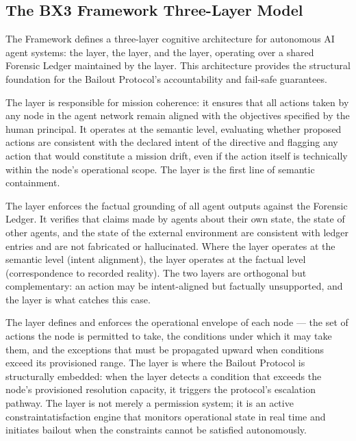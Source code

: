 \subsection{The BX3 Framework Three-Layer Model}
\label{sec:bx3-model}

The \bxthree{} Framework defines a three-layer cognitive architecture for autonomous AI agent systems: the \purpose{} layer, the \truth{} layer, and the \bounds{} layer, operating over a shared Forensic Ledger maintained by the \fact{} layer. This architecture provides the structural foundation for the Bailout Protocol's accountability and fail-safe guarantees.

The \purpose{} layer is responsible for mission coherence: it ensures that all actions taken by any node in the agent network remain aligned with the objectives specified by the human principal. It operates at the semantic level, evaluating whether proposed actions are consistent with the declared intent of the directive and flagging any action that would constitute a mission drift, even if the action itself is technically within the node's operational scope. The \purpose{} layer is the first line of semantic containment.

The \truth{} layer enforces the factual grounding of all agent outputs against the Forensic Ledger. It verifies that claims made by agents about their own state, the state of other agents, and the state of the external environment are consistent with ledger entries and are not fabricated or hallucinated. Where the \purpose{} layer operates at the semantic level (intent alignment), the \truth{} layer operates at the factual level (correspondence to recorded reality). The two layers are orthogonal but complementary: an action may be intent-aligned but factually unsupported, and the \truth{} layer is what catches this case.

The \bounds{} layer defines and enforces the operational envelope of each node — the set of actions the node is permitted to take, the conditions under which it may take them, and the exceptions that must be propagated upward when conditions exceed its provisioned range. The \bounds{} layer is where the Bailout Protocol is structurally embedded: when the \bounds{} layer detects a condition that exceeds the node's provisioned resolution capacity, it triggers the protocol's escalation pathway. The \bounds{} layer is not merely a permission system; it is an active constraintatisfaction engine that monitors operational state in real time and initiates bailout when the constraints cannot be satisfied autonomously.

